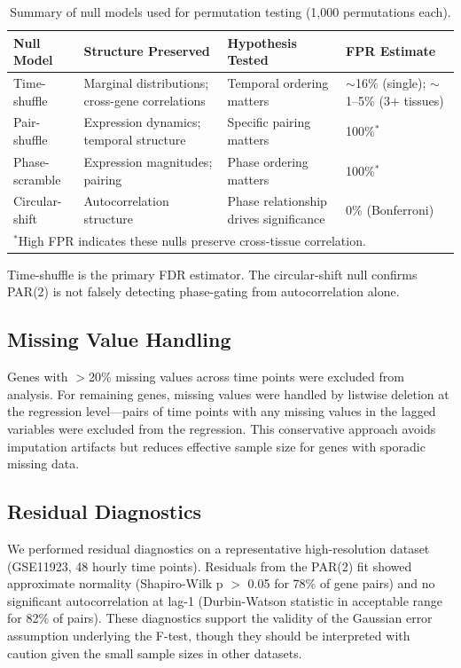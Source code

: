 \documentclass[11pt,a4paper]{article}
\begin{document}
\begin{table}[H]
\centering
\caption{Summary of null models used for permutation testing (1,000 permutations each).}
\label{tab:null_summary}
\begin{tabular}{p{2.5cm}p{3.5cm}p{4cm}p{2.5cm}}
\toprule
Null Model & Structure Preserved & Hypothesis Tested & FPR Estimate \\
\midrule
Time-shuffle & Marginal distributions; cross-gene correlations & Temporal ordering matters & $\sim$16\% (single); $\sim$1--5\% (3+ tissues) \\
Pair-shuffle & Expression dynamics; temporal structure & Specific pairing matters & 100\%$^*$ \\
Phase-scramble & Expression magnitudes; pairing & Phase ordering matters & 100\%$^*$ \\
Circular-shift & Autocorrelation structure & Phase relationship drives significance & 0\% (Bonferroni) \\
\bottomrule
\multicolumn{4}{l}{\small $^*$High FPR indicates these nulls preserve cross-tissue correlation.} \\
\end{tabular}
\end{table}

Time-shuffle is the primary FDR estimator. The circular-shift null confirms PAR(2) is not falsely detecting phase-gating from autocorrelation alone.

\subsection{Missing Value Handling}

Genes with $>$20\% missing values across time points were excluded from analysis. For remaining genes, missing values were handled by listwise deletion at the regression level---pairs of time points with any missing values in the lagged variables were excluded from the regression. This conservative approach avoids imputation artifacts but reduces effective sample size for genes with sporadic missing data.

\subsection{Residual Diagnostics}

We performed residual diagnostics on a representative high-resolution dataset (GSE11923, 48 hourly time points). Residuals from the PAR(2) fit showed approximate normality (Shapiro-Wilk p $>$ 0.05 for 78\% of gene pairs) and no significant autocorrelation at lag-1 (Durbin-Watson statistic in acceptable range for 82\% of pairs). These diagnostics support the validity of the Gaussian error assumption underlying the F-test, though they should be interpreted with caution given the small sample sizes in other datasets.
\end{document}
